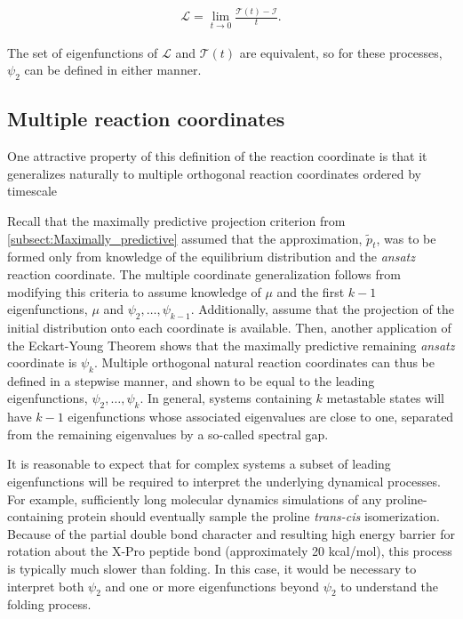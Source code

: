 \documentclass[aip, jcp, reprint, nolinenumbers, twocolumn, nobalancelastpage]{revtex4-1} %
\begin{document}
\begin{align}
\mathcal{L} = \lim_{t\rightarrow 0} \frac{\mathcal{T}(t) - \mathcal{I}}{t}.
\end{align}

The set of eigenfunctions of $\mathcal{L}$ and $\mathcal{T}(t)$ are equivalent, so for these processes, $\psi_2$ can be defined in either manner.

\subsection{Multiple reaction coordinates}
\label{subsect:multiple_reaction_coordinates}
One attractive property of this definition of the reaction coordinate is that it generalizes naturally to multiple orthogonal reaction coordinates ordered by timescale

Recall that the maximally predictive projection criterion from \cref{subsect:Maximally_predictive} assumed that the approximation, $\tilde{p}_t$, was to be formed only from knowledge of the equilibrium distribution and the \emph{ansatz} reaction coordinate. The multiple coordinate generalization follows from modifying this criteria to assume knowledge of $\mu$ and the first $k-1$ eigenfunctions, $\mu$ and $\psi_2, \ldots, \psi_{k-1}$. Additionally, assume that the projection of the initial distribution onto each coordinate is available. Then, another application of the Eckart-Young Theorem shows that the maximally predictive remaining \emph{ansatz} coordinate is $\psi_{k}$. Multiple orthogonal natural reaction coordinates can thus be defined in a stepwise manner, and shown to be equal to the leading eigenfunctions, $\psi_2, \ldots, \psi_k$. In general, systems containing $k$ metastable states will have $k-1$ eigenfunctions whose associated eigenvalues are close to one, separated from the remaining eigenvalues by a so-called spectral gap.\cite{prinz2011markov}

It is reasonable to expect that for complex systems a subset of leading eigenfunctions will be required to interpret the underlying dynamical processes. For example, sufficiently long molecular dynamics simulations of any proline-containing protein should eventually sample the proline \textit{trans-cis} isomerization. Because of the partial double bond character and resulting high energy barrier for rotation about the X-Pro peptide bond (approximately 20 kcal/mol), this process is typically much slower than folding.\cite{Wedemeyer_Biochemistry02, Banushkina_JCP15} In this case, it would be necessary to interpret both $\psi_2$ and one or more eigenfunctions beyond $\psi_2$ to understand the folding process.
\end{document}
